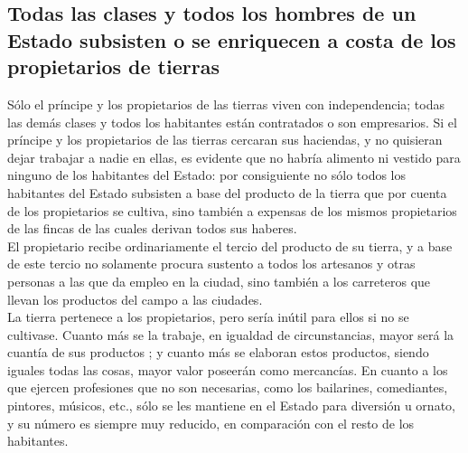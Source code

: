 \documentclass[10pt]{article}
\begin{document}
\begin{multicols}{1}
\section*{Todas las clases y todos los hombres de un Estado subsisten o se enriquecen a costa de los propietarios de tierras}
Sólo el príncipe y los propietarios de las tierras viven con independencia; todas las demás clases y todos los habitantes están contratados o son empresarios. Si el príncipe y los propietarios de las tierras cercaran sus haciendas, y no quisieran dejar trabajar a nadie en ellas, es evidente que no habría alimento ni vestido para ninguno de los habitantes del Estado: por consiguiente no sólo todos los habitantes del Estado subsisten a base del producto de la tierra que por cuenta de los propietarios se cultiva, sino también a expensas de los mismos propietarios de las fincas de las cuales derivan todos sus haberes.\\
El propietario recibe ordinariamente el tercio del producto de su tierra, y a base de este tercio no solamente procura sustento a todos los artesanos y otras personas a las que da empleo en la ciudad, sino también a los carreteros que llevan los productos del campo a las ciudades.\\
La tierra pertenece a los propietarios, pero sería inútil para ellos si no se cultivase. Cuanto más se la trabaje, en igualdad de circunstancias, mayor será la cuantía de sus productos ; y cuanto más se elaboran estos productos, siendo iguales todas las cosas, mayor valor poseerán como mercancías.
En cuanto a los que ejercen profesiones que no son necesarias, como los bailarines, comediantes, pintores, músicos, etc., sólo se les mantiene en el Estado para diversión u ornato, y su número es siempre muy reducido, en comparación con el resto de los habitantes.

\end{multicols}
\end{document}
